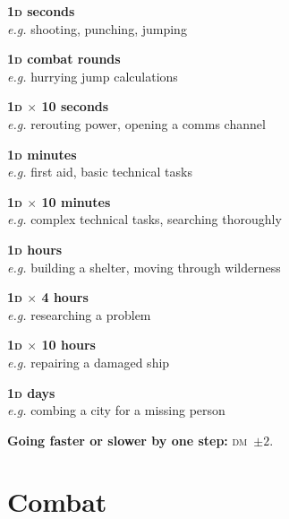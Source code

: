 \documentclass[10pt]{article}
\newcommand\dice[1]{\textsc{#1}}
\newcommand{\diemod}[1]{\textsc{dm}~#1}
\begin{document}
\begin{multicols}{3}
\textbf{\dice{1d} seconds}\\
\textit{e.g.} shooting, punching, jumping

\textbf{\dice{1d} combat rounds}\\
\textit{e.g.} hurrying jump calculations

\textbf{\dice{1d $\times$ 10} seconds}\\
\textit{e.g.} rerouting power, opening a comms channel

\textbf{\dice{1d} minutes}\\
\textit{e.g.} first aid, basic technical tasks

\textbf{\dice{1d $\times$ 10} minutes}\\
\textit{e.g.} complex technical tasks, searching thoroughly

\textbf{\dice{1d} hours}\\
\textit{e.g.} building a shelter, moving through wilderness

\textbf{\dice{1d $\times$ 4} hours}\\
\textit{e.g.} researching a problem

\textbf{\dice{1d $\times$ 10} hours}\\
\textit{e.g.} repairing a damaged ship

\textbf{\dice{1d} days}\\
\textit{e.g.} combing a city for a missing person

\textbf{Going faster or slower by one step:} \diemod{$\pm 2$}.
\end{multicols}

\section{Combat}
\end{document}
